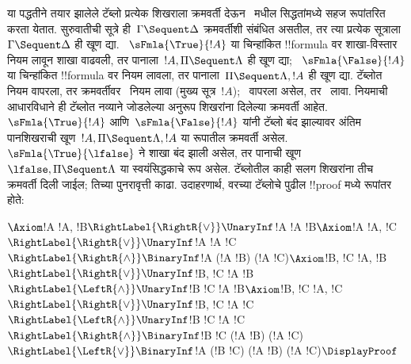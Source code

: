\documentclass[../../../include/open-logic-section]{subfiles}
\begin{document}
या पद्धतीने तयार झालेले टॅब्लो प्रत्येक
शिखराला क्रमवर्ती देऊन~ मधील सिद्धतांमध्ये
सहज रूपांतरित करता येतात. सुरुवातीची
सूत्रे ही~$\Gamma \Sequent \Delta$
क्रमवर्तीशी संबंधित असतील, तर त्या प्रत्येक
सूत्राला~$\Gamma \Sequent \Delta$ ही खूण द्या.
~$\sFmla{\True}{!A}$ या चिन्हांकित !!{formula}
वर शाखा-विस्तार नियम लावून शाखा वाढवली, तर
पानाला~$!A, \Pi \Sequent \Lambda$ ही खूण द्या;
~$\sFmla{\False}{!A}$ या चिन्हांकित !!{formula}
वर नियम लावला,
तर पानाला~$\Pi \Sequent \Lambda, !A$ ही खूण द्या.
टॅब्लोत~\TRule{\True}{\star} नियम वापरला,
तर क्रमवर्तीवर~\LeftR{\star} नियम लावा
(मुख्य सूत्र~$!A$);~\TRule{\False}{\star}
वापरला असेल, तर~\RightR{\star} लावा.
नियमाची आधारविधाने ही टॅब्लोत नव्याने
जोडलेल्या अनुरूप शिखरांना दिलेल्या क्रमवर्ती आहेत.
~$\sFmla{\True}{!A}$ आणि~$\sFmla{\False}{!A}$
यांनी टॅब्लो बंद झाल्यावर अंतिम पानशिखराची
खूण~$!A, \Pi \Sequent \Lambda, !A$
या रूपातील क्रमवर्ती असेल. $\sFmla{\True}{\lfalse}$
ने शाखा बंद झाली असेल, तर पानाची खूण
$\lfalse,\Pi\Sequent\Lambda$ या स्वयंसिद्धकाचे रूप असेल.
टॅब्लोतील काही सलग
शिखरांना तीच क्रमवर्ती दिली जाईल; तिच्या
पुनरावृत्ती काढा. उदाहरणार्थ, वरच्या टॅब्लोचे
पुढील !!{proof} मध्ये रूपांतर होते:
\begin{maxwidth}
$
\Axiom$!A \fCenter !A, !B$
\RightLabel{\RightR{\lor}}
\UnaryInf$!A \fCenter !A \lor !B$
\Axiom$!A \fCenter !A, !C$
\RightLabel{\RightR{\lor}}
\UnaryInf$!A \fCenter !A \lor !C$
\RightLabel{\RightR{\land}}
\BinaryInf$!A \fCenter (!A \lor !B) \land (!A \lor !C)$
\Axiom$!B, !C \fCenter !A, !B$
\RightLabel{\RightR{\lor}}
\UnaryInf$!B, !C \fCenter !A \lor !B$
\RightLabel{\LeftR{\land}}
\UnaryInf$!B \land !C \fCenter !A \lor !B$
\Axiom$!B, !C \fCenter !A, !C$
\RightLabel{\RightR{\lor}}
\UnaryInf$!B, !C \fCenter !A \lor !C$
\RightLabel{\LeftR{\land}}
\UnaryInf$!B \land !C \fCenter !A \lor !C$
\RightLabel{\RightR{\land}}
\BinaryInf$!B \land !C \fCenter (!A \lor !B) \land
(!A \lor !C)$
\RightLabel{\LeftR{\lor}}
\BinaryInf$!A \lor (!B \land !C) \fCenter (!A \lor !B) \land
(!A \lor !C)$
\DisplayProof$
\end{maxwidth}
\end{document}
